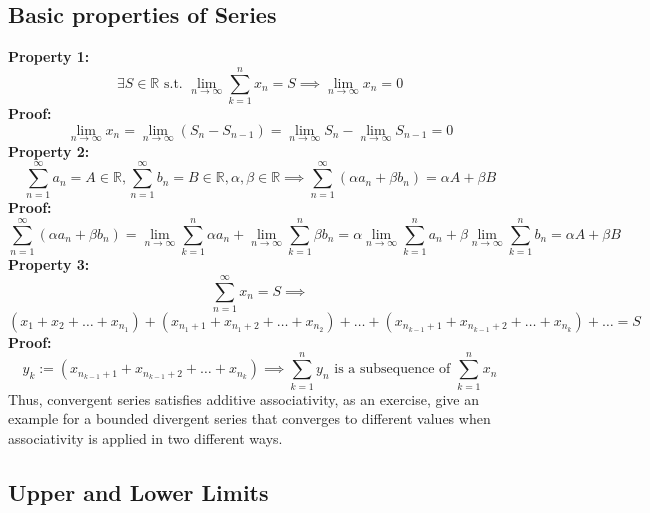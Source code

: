 \documentclass{article}
\newcommand{\0}{{\bf{0}}}
\begin{document}
\subsection{Basic properties of Series}
\textbf{Property 1:}
$$\exists S\in\mathbb{R}\mbox{ s.t. }\lim_{n\to\infty}\sum_{k=1}^nx_n=S\implies\lim_{n\to\infty}x_n=0$$
\textbf{Proof:}
$$\lim_{n\to\infty}x_n=\lim_{n\to\infty}(S_n-S_{n-1})=\lim_{n\to\infty}S_n-\lim_{n\to\infty}S_{n-1}=0$$
\textbf{Property 2:}
$$\sum_{n=1}^{\infty}a_n=A\in\mathbb{R},\sum_{n=1}^{\infty}b_n=B\in\mathbb{R},\alpha,\beta\in\mathbb{R}\implies\sum_{n=1}^{\infty}(\alpha a_n+\beta b_n)=\alpha A+\beta B$$
\textbf{Proof:}
$$\sum_{n=1}^{\infty}(\alpha a_n+\beta b_n)=\lim_{n\to\infty}\sum_{k=1}^{n}\alpha a_n+\lim_{n\to\infty}\sum_{k=1}^{n}\beta b_n=\alpha\lim_{n\to\infty}\sum_{k=1}^{n}a_n+\beta\lim_{n\to\infty}\sum_{k=1}^{n}b_n=\alpha A+\beta B$$
\textbf{Property 3:}
$$\sum_{n=1}^{\infty}x_n=S\implies$$
$$(x_1+x_2+\dots+x_{n_1})+(x_{n_1+1}+x_{n_1+2}+\dots+x_{n_2})+\dots+(x_{n_{k-1}+1}+x_{n_{k-1}+2}+\dots+x_{n_k})+\dots=S$$
\textbf{Proof:}
$$y_k:=(x_{n_{k-1}+1}+x_{n_{k-1}+2}+\dots+x_{n_k})\implies\sum_{k=1}^ny_n\mbox{ is a subsequence of }\sum_{k=1}^nx_n$$
Thus, convergent series satisfies additive associativity, as an exercise, give an example for a bounded divergent series that converges to different values when associativity is applied in two different ways.
\subsection{Upper and Lower Limits}
\end{document}

